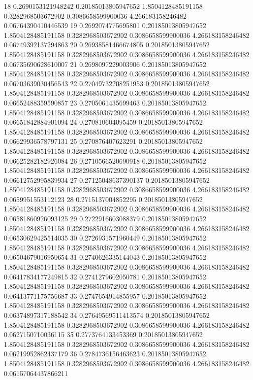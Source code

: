 {18 0.2690153121948242 0.20185013805947652 1.8504128485191158 0.3282968503672902 0.3086658599900036 4.266183158246482 0.06764390410446539
19 0.2692074775695801 0.20185013805947652 1.8504128485191158 0.3282968503672902 0.3086658599900036 4.266183158246482 0.06749392137294863
20 0.26938581466674805 0.20185013805947652 1.8504128485191158 0.3282968503672902 0.3086658599900036 4.266183158246482 0.06735690628610007
21 0.2698097229003906 0.20185013805947652 1.8504128485191158 0.3282968503672902 0.3086658599900036 4.266183158246482 0.06703639030456543
22 0.27049732208251953 0.20185013805947652 1.8504128485191158 0.3282968503672902 0.3086658599900036 4.266183158246482 0.06652488359590857
23 0.2705061435699463 0.20185013805947652 1.8504128485191158 0.3282968503672902 0.3086658599900036 4.266183158246482 0.06651842884901094
24 0.270810604095459 0.20185013805947652 1.8504128485191158 0.3282968503672902 0.3086658599900036 4.266183158246482 0.06629936578797131
25 0.270876407623291 0.20185013805947652 1.8504128485191158 0.3282968503672902 0.3086658599900036 4.266183158246482 0.06625282182926084
26 0.2710566520690918 0.20185013805947652 1.8504128485191158 0.3282968503672902 0.3086658599900036 4.266183158246482 0.06612752995839934
27 0.27125048637390137 0.20185013805947652 1.8504128485191158 0.3282968503672902 0.3086658599900036 4.266183158246482 0.0659951553112123
28 0.2715137004852295 0.20185013805947652 1.8504128485191158 0.3282968503672902 0.3086658599900036 4.266183158246482 0.06581860926093125
29 0.2722916603088379 0.20185013805947652 1.8504128485191158 0.3282968503672902 0.3086658599900036 4.266183158246482 0.06530629425514035
30 0.2726931571960449 0.20185013805947652 1.8504128485191158 0.3282968503672902 0.3086658599900036 4.266183158246482 0.06504679016950654
31 0.2740626335144043 0.20185013805947652 1.8504128485191158 0.3282968503672902 0.3086658599900036 4.266183158246482 0.06417834177249815
32 0.2741279602050781 0.20185013805947652 1.8504128485191158 0.3282968503672902 0.3086658599900036 4.266183158246482 0.06413771175756687
33 0.2747654914855957 0.20185013805947652 1.8504128485191158 0.3282968503672902 0.3086658599900036 4.266183158246482 0.06374897317188542
34 0.27649569511413574 0.20185013805947652 1.8504128485191158 0.3282968503672902 0.3086658599900036 4.266183158246482 0.0627150710036115
35 0.2773764133453369 0.20185013805947652 1.8504128485191158 0.3282968503672902 0.3086658599900036 4.266183158246482 0.06219952862437179
36 0.2784736156463623 0.20185013805947652 1.8504128485191158 0.3282968503672902 0.3086658599900036 4.266183158246482 0.06157064437866211
}
